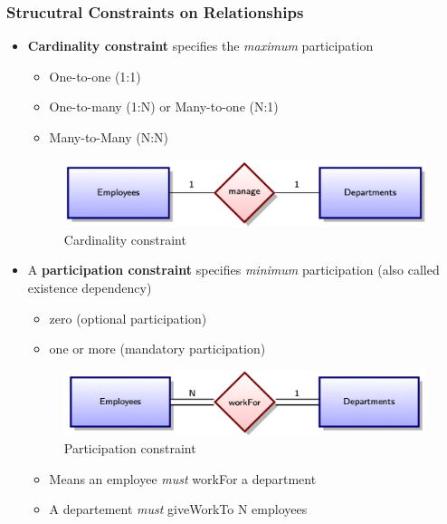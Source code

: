 \subsubsection{Strucutral Constraints on Relationships}
\begin{itemize}[label=\(\rhd\)]
    \item \textbf{Cardinality constraint} specifies the \textit{maximum} participation
    \begin{itemize}[label=\(\rhd\)]
        \item One-to-one (1:1)
        \item One-to-many (1:N) or Many-to-one (N:1)
        \item Many-to-Many (N:N)
    \end{itemize}

    \begin{figure}[H]
        \centering
        \includegraphics[width=0.5\linewidth]{images/Screenshot 2024-05-22 at 10.33.11.jpg}
        \caption{Cardinality constraint}
    \end{figure}
    \item A \textbf{participation constraint} specifies \textit{minimum} participation (also called existence dependency)
    \begin{itemize}[label=\(\rhd\)]
        \item zero (optional participation)
        \item one or more (mandatory participation)
    \end{itemize}
    \begin{figure}[H]
        \centering
        \includegraphics[width=0.5\linewidth]{images/Screenshot 2024-05-22 at 10.33.47.jpg}
        \caption{Participation constraint}
    \end{figure}\begin{itemize}[label=\(\rhd\)]
        \item Means an employee \textit{must} workFor a department
        \item A departement \textit{must} giveWorkTo N employees
    \end{itemize}
\end{itemize}

